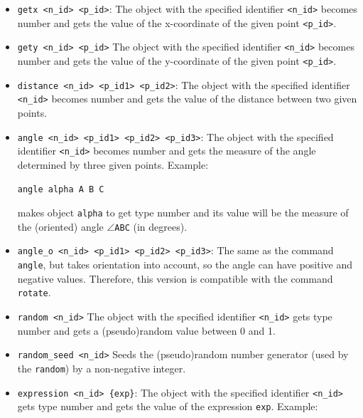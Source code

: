 \documentclass[a4paper]{book}
\begin{document}
\begin{itemize}
\item \verb|getx <n_id> <p_id>|:
        The object with the specified identifier \verb|<n_id>| becomes
        {\sc number} and gets the value of the x-coordinate of the
        given point \verb|<p_id>|.

\item \verb|gety <n_id> <p_id>|
        The object with the specified identifier \verb|<n_id>| becomes
        {\sc number} and gets the value of the y-coordinate of the
        given point \verb|<p_id>|.

\item \verb|distance <n_id> <p_id1> <p_id2>|:
        The object with the specified identifier \verb|<n_id>| becomes {\sc number}
        and gets the value of the distance between two given points.

\item \verb|angle <n_id> <p_id1> <p_id2> <p_id3>|:
        The object with the specified identifier \verb|<n_id>| becomes {\sc number}
        and gets the measure of the angle determined by three given points.
        Example:

        \verb|angle alpha A B C|

        makes object \verb|alpha| to get type {\sc number} and its value will
        be the measure of the (oriented) angle $\angle$\verb|ABC| (in degrees).

\item \verb|angle_o <n_id> <p_id1> <p_id2> <p_id3>|:
        The same as the command \verb|angle|, but takes orientation into
        account, so the angle can have positive and negative values.
        Therefore, this version is compatible with the command \verb|rotate|.

\item \verb|random <n_id>|
        The object with the specified identifier \verb|<n_id>| gets type {\sc number}
        and gets a (pseudo)random value between 0 and 1.

\item \verb|random_seed <n_id>|
        Seeds the (pseudo)random number generator (used by the \verb|random|) by a non-negative integer.

\item \verb|expression <n_id> {exp}|:
        The object with the specified identifier \verb|<n_id>| gets type {\sc number}
        and gets the value of the expression \verb|exp|.
        Example:


\end{itemize}
\end{document}
